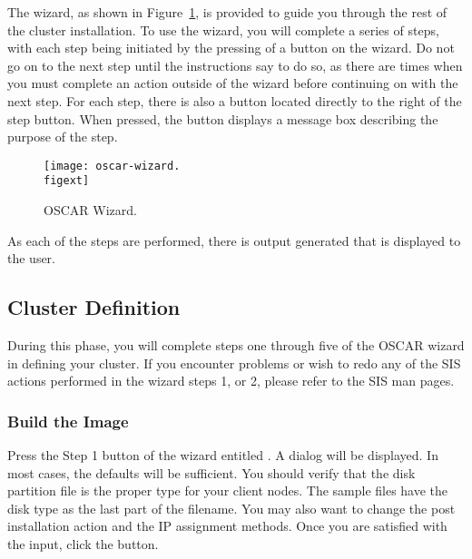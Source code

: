 The wizard, as shown in
Figure~\ref{fig:detailed-oscar-wizard}, is provided to guide you
through the rest of the cluster installation.  To use the wizard, you
will complete a series of steps, with each step being initiated by the
pressing of a button on the wizard. Do not go on to the next step
until the instructions say to do so, as there are times when you must
complete an action outside of the wizard before continuing on with the
next step. For each step, there is also a  button located
directly to the right of the step button. When pressed, the
 button displays a message box describing the purpose of
the step.

\begin{figure}[htbp]
  \begin{center}
    \texttt{[image: oscar-wizard.\\figext]}
    \caption{OSCAR Wizard.}
    \label{fig:detailed-oscar-wizard}
  \end{center}
\end{figure}
  
As each of the steps are performed, there is output generated that is
displayed to the user. 


\subsection{Cluster Definition}
\label{sec:detailed-cluster-def}

During this phase, you will complete steps one through five of the
OSCAR wizard in defining your cluster. If you encounter problems or
wish to redo any of the SIS actions performed in the wizard steps 1,
or 2, please refer to the SIS man pages.

\subsubsection{Build the Image} 

Press the Step 1 button of the wizard entitled . A dialog will be displayed. In most cases, the defaults 
will be sufficient. You should verify that the disk partition file is
the proper type for your client nodes. The sample files have the
disk type as the last part of the filename. You may also want to change
the post installation action and the IP assignment methods.
Once you are satisfied with the input, click the  button.

